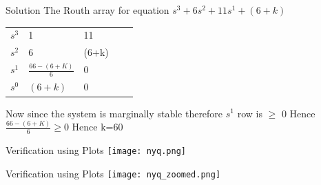 \documentclass{beamer}
\begin{document}
\begin{frame}{Solution}
The Routh array for equation $s^3+6s^2+11s^1+(6+k)$
\begin{table}[]
\begin{tabular}{lllll}
$s^3$ & 1            & 11    &  &  \\
$s^2$ & 6            & (6+k) &  &  \\
$s^1$ & $\frac{66-(6+K)}{6}$& 0     &  &  \\
$s^0$ & $(6+k)$        & 0     &  & 


\end{tabular}
\end{table}
Now since the system is marginally stable therefore $s^1$ row is $\geq$ 0\newline
Hence $\frac{66-(6+K)}{6}$$\geq$0
Hence k=60
\end{frame}
\begin{frame}{Verification using Plots}
\texttt{[image: nyq.png]}

\end{frame}
\begin{frame}{Verification using Plots}
\texttt{[image: nyq\_zoomed.png]}

\end{frame}
\end{document}
